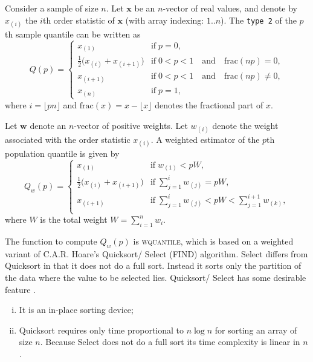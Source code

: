 \documentclass[a4paper,oneside,11pt,DIV=12]{scrartcl}
\newcommand{\code}[1]{{\texttt{#1}}}
\begin{document}
Consider a sample of size $n$. Let $\bm x$ be an $n$-vector of real values,
and denote by $x_{(i)}$ the $i$th order statistic of $\bm x$ (with array
indexing: $1..n$). The \code{type 2} of the $p$th sample quantile can be
written as
\begin{equation*}
	Q(p) = \begin{cases}
		x_{(1)} & \text{if} \; p = 0, \\
		\frac{1}{2}\big(x_{(i)} + x_{(i+1)}\big) & \text{if} \; 0 < p < 1
			\quad \text{and} \quad \mathrm{frac}(np) = 0, \\
 		x_{(i+1)} & \text{if} \; 0 < p < 1 \quad \text{and} \quad
			\mathrm{frac}(np) \neq 0, \\
		x_{(n)} & \text{if} \; p = 1,
	\end{cases}
\end{equation*}
\noindent where $i=\lfloor pn\rfloor$ and $\mathrm{frac}(x) = x - \lfloor x
\rfloor$ denotes the fractional part of $x$.

Let $\bm w$ denote an $n$-vector of positive weights. Let $w_{(i)}$ denote
the weight associated with the order statistic $x_{(i)}$. A weighted
estimator of the $p$th population quantile is given by
\begin{equation*}
	Q_w(p) = \begin{cases}
		x_{(1)} & \text{if} \; w_{(1)} < p W, \\
		\frac{1}{2}\big(x_{(i)} + x_{(i+1)}\big) & \text{if} \;
			\sum_{j=1}^i w_{(j)} = p W, \\
		x_{(i+1)} & \text{if} \; \sum_{j=1}^i w_{(j)} < p W <
			\sum_{j=1}^{i+1} w_{(k)}, \\
	\end{cases}
\end{equation*}
\noindent where $W$ is the total weight $W = \sum_{i=1}^n w_i$.

The function to compute $Q_w(p)$ is \textsc{wquantile}, which is based
on a weighted variant of C.A.R. Hoare's Quicksort/ Select (FIND) algorithm.
Select differs from Quicksort in that it does not do a full sort. Instead
it sorts only the partition of the data where the value to be selected
lies. Quicksort/ Select has some desirable feature
\citep[][p. 303]{sedgewick_1997}.
\begin{enumerate}[i)]
	\item It is an in-place sorting device;
	\item Quicksort requires only time proportional to $n \log n$ for
		sorting an array of size $n$. Because Select does not do a full
		sort its time complexity is linear in $n$.
\end{enumerate}
\end{document}
